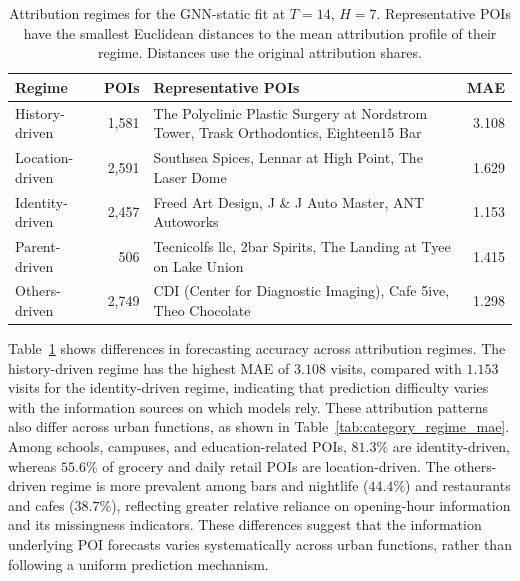 \documentclass[preprint,authoryear,11pt]{elsarticle}
\theoremstyle{definition}
\begin{document}
\begin{table}[!htbp]
\centering
\fontsize{9pt}{11pt}\selectfont
\captionsetup{skip=5pt}
\caption{Attribution regimes for the GNN-static fit at \(T=14\), \(H=7\). Representative POIs have the smallest Euclidean distances to the mean attribution profile of their regime. Distances use the original attribution shares.}
\label{tab:attri_regime}
\setlength{\tabcolsep}{4pt}
\renewcommand{\arraystretch}{1.15}
\begin{tabularx}{\linewidth}{@{}lr>{\raggedright\arraybackslash}Xr@{}}
\toprule
Regime & POIs & Representative POIs & MAE \\
\midrule
History-driven & 1,581 & The Polyclinic Plastic Surgery at Nordstrom Tower, Trask Orthodontics, Eighteen15 Bar & 3.108 \\
Location-driven & 2,591 & Southsea Spices, Lennar at High Point, The Laser Dome & 1.629 \\
Identity-driven & 2,457 & Freed Art Design, J \& J Auto Master, ANT Autoworks & 1.153 \\
Parent-driven & 506 & Tecnicolfs llc, 2bar Spirits, The Landing at Tyee on Lake Union & 1.415 \\
Others-driven & 2,749 & CDI (Center for Diagnostic Imaging), Cafe 5ive, Theo Chocolate & 1.298 \\
\bottomrule
\end{tabularx}
\end{table}


Table~\ref{tab:attri_regime} shows differences in forecasting accuracy across attribution regimes.
The history-driven regime has the highest MAE of \(3.108\) visits, compared with \(1.153\) visits for the identity-driven regime, indicating that prediction difficulty varies with the information sources on which models rely.
These attribution patterns also differ across urban functions, as shown in Table~\ref{tab:category_regime_mae}.
Among schools, campuses, and education-related POIs, \(81.3\%\) are identity-driven, whereas \(55.6\%\) of grocery and daily retail POIs are location-driven.
The others-driven regime is more prevalent among bars and nightlife (\(44.4\%\)) and restaurants and cafes (\(38.7\%\)), reflecting greater relative reliance on opening-hour information and its missingness indicators.
These differences suggest that the information underlying POI forecasts varies systematically across urban functions, rather than following a uniform prediction mechanism.
\end{document}
